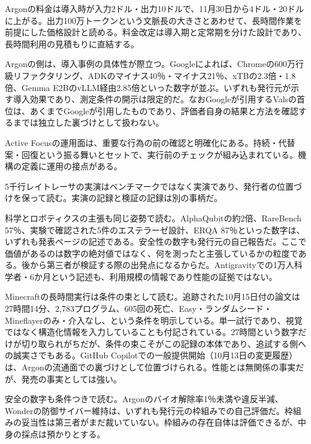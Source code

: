 \documentclass[lualatex,a4paper,10pt]{jlreq}
\begin{document}
Argonの料金は導入時が入力2ドル・出力10ドルで、11月30日から4ドル・20ドルに上がる。出力100万トークンという文脈長の大きさとあわせて、長時間作業を前提にした価格設計と読める。料金改定は導入期と定常期を分けた設計であり、長時間利用の見積もりに直結する。
\cite{B05,B65,B08,B04,B07,B06}


Argonの側は、導入事例の具体性が際立つ。Googleによれば、Chromeの600万行級リファクタリング、ADKのマイナス40％・マイナス21％、xTBの2.3倍・1.8倍、Gemma E2BのvLLM経由2.85倍といった数字が並ぶ。いずれも発行元が示す導入効果であり、測定条件の開示は限定的だ。なおGoogleが引用するValsの首位は、あくまでGoogleが引用したものであり、評価者自身の結果と方法を確認するまでは独立した裏づけとして扱わない。
\cite{B05,B65,B08,B04,B07,B06}


Active Focusの運用面は、重要な行為の前の確認と明確化にある。持続・代替案・回復という振る舞いとセットで、実行前のチェックが組み込まれている。機構の定義に運用の接点がある。
\cite{B01,B62,B63,B02,B64,B03}


5千行レイトレーサの実演はベンチマークではなく実演であり、発行者の位置づけを保って読む。実演の記録と検証の記録は別の事柄だ。
\cite{B08,B65,B05,B04,B07,B06}


科学とロボティクスの主張も同じ姿勢で読む。AlphaQubitの約2倍、RareBench 57％、実験で確認された5件のエステラーゼ設計、ERQA 87％といった数字は、いずれも発表ページの記述である。安全性の数字も発行元の自己報告だ。ここで価値があるのは数字の絶対値ではなく、何を測ったと主張しているかの粒度である。後から第三者が検証する際の出発点になるからだ。Antigravityでの1万人科学者・6か月という記述も、利用規模の情報であり性能の証拠ではない。
\cite{B05,B65,B08,B04,B07,B06}


Minecraftの長時間実行は条件の束として読む。追跡された10月15日付の論文は27時間14分、2,783プログラム、605回の死亡、Easy・ランダムシード・Mineflayerのみ・介入なし、という条件を明示している。単一試行であり、視覚ではなく構造化情報を入力していることも付記されている。27時間という数字だけが切り取られがちだが、条件の束こそがこの記録の本体であり、追試する側への誠実さでもある。GitHub Copilotでの一般提供開始（10月13日の変更履歴）は、Argonの流通面での裏づけとして位置づけられる。性能とは無関係の事実だが、発売の事実としては強い。
\cite{B05,B65,B08,B04,B07,B06}


安全の数字も条件つきで読む。Argonのバイオ解除率1％未満や違反半減、Wonderの防御サイバー維持は、いずれも発行元の枠組みでの自己評価だ。枠組みの妥当性は第三者がまだ裁いていない。枠組みの存在自体は評価できるが、中身の採点は預かりとする。
\cite{B01,B62,B63,B02,B64,B03,B05,B65}
\end{document}
